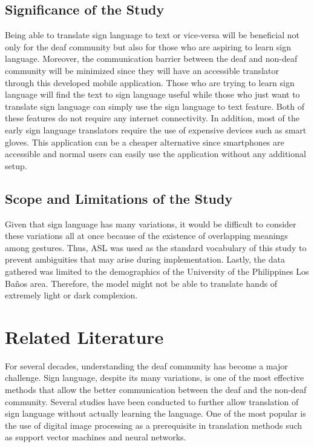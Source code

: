 \documentclass[journal]{./IEEE/IEEEtran}
\begin{document}
\subsection{Significance of the Study}
\indent Being able to translate sign language to text or vice-versa will be beneficial not only for the deaf community but also for those who are aspiring to learn sign language. Moreover, the communication barrier between the deaf and non-deaf community will be minimized since they will have an accessible translator through this developed mobile application.
\newline
\indent Those who are trying to learn sign language will find the text to sign language useful while those who just want to translate sign language can simply use the sign language to text feature. Both of these features do not require any internet connectivity.
\newline
\indent In addition, most of the early sign language translators require the use of expensive devices such as smart gloves. This application can be a cheaper alternative since smartphones are accessible and normal users can easily use the application without any additional setup. 

\subsection{Scope and Limitations of the Study}
\indent Given that sign language has many variations, it would be difficult to consider these variations all at once because of the existence of overlapping meanings among gestures. Thus, ASL was used as the standard vocabulary of this study to prevent ambiguities that may arise during implementation.
\newline
\indent Lastly, the data gathered was limited to the demographics of the University of the Philippines Los Ba\~{n}os area. Therefore, the model might not be able to translate hands of extremely light or dark complexion.
\newline

\section{Related Literature}
For several decades, understanding the deaf community has become a major challenge. Sign language, despite its many variations, is one of the most effective methods that allow the better communication between the deaf and the non-deaf community. Several studies have been conducted to further allow translation of sign language without actually learning the language. One of the most popular is the use of digital image processing as a prerequisite in translation methods such as support vector machines and neural networks.
\end{document}
